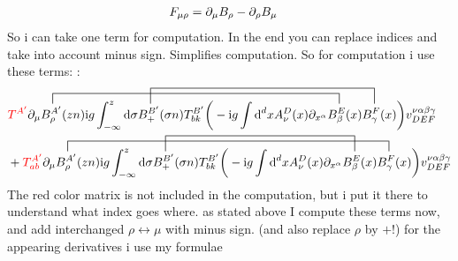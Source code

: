 \begin{align}
	F_{\mu \rho} 
	&=
	\partial_\mu B_\rho - \partial_\rho B_\mu
\end{align}
So i can take one term for computation. In the end you can replace indices and take into account minus sign. Simplifies computation.
So for computation i use these terms: :
\begin{align}
	&\contraction[2ex]{\partial_\mu B^{A'}_\rho}{B^{A'}_\rho}{(zn) \imag g \int _{-\infty}^{z} \dx \sigma B_+^{B'}(\sigma n) T^{B'}_{bk}\bigg(-\imag g \int \ddx x A_\nu^D(x) \partial_{x^\alpha}B}{}
	\contraction[3ex]{\partial_\mu B^{A'}_\rho (zn) \imag g \int _{-\infty}^{z} \dx \sigma B_+^{B'}}{ B_+^{B'}}{(\sigma n) T^{B'}_{bk}\bigg(-\imag g \int \ddx xA_\nu^D(x) \partial_{x^\alpha}B_\beta^{E}(x)B}{}
	{\color{red}T^{A'}}\partial_\mu B^{A'}_\rho (zn) \imag g \int _{-\infty}^{z} \dx \sigma B_+^{B'}(\sigma n) T^{B'}_{bk}\bigg(-\imag g \int \ddx xA_\nu^D(x) \partial_{x^\alpha} B_\beta^{E} (x) B_\gamma^F(x) \bigg) v^{\nu \alpha\beta\gamma}_{DEF}
	\\
	&+
	\contraction[2ex]{\partial_\mu B^{A'}_\rho}{B^{A'}_\rho}{(zn) \imag g \int _{-\infty}^{z} \dx \sigma B_+^{B'}(\sigma n) T^{B'}_{bk}\bigg(-\imag g \int \ddx xA_\nu^D(x) \partial_{x^\alpha}B_\beta^{E} (x) B}{}
	\contraction[3ex]{\partial_\mu B^{A'}_\rho (zn) \imag g \int _{-\infty}^{z} \dx \sigma B_+^{B'}}{ B_+^{B'}}{(\sigma n) T^{B'}_{bk}\bigg(-\imag g \int \ddx xA_\nu^D(x) \partial_{x^\alpha}B}{}
	{\color{red}T^{A'}_{ab}}\partial_\mu B^{A'}_\rho (zn) \imag g \int _{-\infty}^{z} \dx \sigma B_+^{B'}(\sigma n) T^{B'}_{bk}\bigg(-\imag g \int \ddx xA_\nu^D(x) \partial_{x^\alpha} B_\beta^{E} (x) B_\gamma^F(x) \bigg) v^{\nu \alpha\beta\gamma}_{DEF}
\end{align}
The red color matrix is not included in the computation, but i put it there to understand what index goes where.
as stated above I compute these terms now, and add interchanged $\rho \leftrightarrow \mu$ with minus sign. (and also replace $\rho $ by $+$!)
for the appearing derivatives i use my formulae

